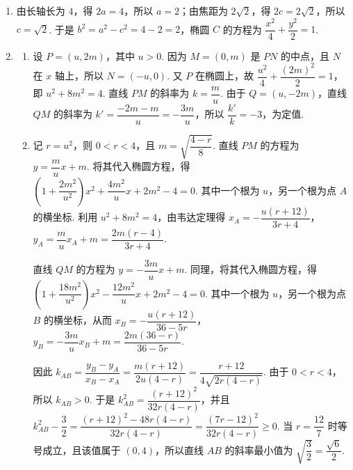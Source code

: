 \begin{solution}
\begin{enumerate}
\item 由长轴长为 \(4\)，得 \(2a=4\)，所以 \(a=2\)；由焦距为 \(2\sqrt2\)，得 \(2c=2\sqrt2\)，所以 \(c=\sqrt2\). 于是 \(b^2=a^2-c^2=4-2=2\)，椭圆 \(C\) 的方程为 \(\dfrac{x^2}{4}+\dfrac{y^2}{2}=1\).
\item
\begin{enumerate}
\item 设 \(P=(u,2m)\)，其中 \(u>0\). 因为 \(M=(0,m)\) 是 \(PN\) 的中点，且 \(N\) 在 \(x\) 轴上，所以 \(N=(-u,0)\). 又 \(P\) 在椭圆上，故 \(\dfrac{u^2}{4}+\dfrac{(2m)^2}{2}=1\)，即 \(u^2+8m^2=4\). 直线 \(PM\) 的斜率为 \(k=\dfrac{m}{u}\). 由于 \(Q=(u,-2m)\)，直线 \(QM\) 的斜率为 \(k'=\dfrac{-2m-m}{u}=-\dfrac{3m}{u}\)，所以 \(\dfrac{k'}{k}=-3\)，为定值.
\item 记 \(r=u^2\)，则 \(0<r<4\)，且 \(m=\sqrt{\dfrac{4-r}{8}}\). 直线 \(PM\) 的方程为 \(y=\dfrac{m}{u}x+m\). 将其代入椭圆方程，得
\(\left(1+\dfrac{2m^2}{u^2}\right)x^2+\dfrac{4m^2}{u}x+2m^2-4=0\). 其中一个根为 \(u\)，另一个根为点 \(A\) 的横坐标. 利用 \(u^2+8m^2=4\)，由韦达定理得
\(x_A=-\dfrac{u(r+12)}{3r+4}\)，\(y_A=\dfrac{m}{u}x_A+m=\dfrac{2m(r-4)}{3r+4}\).

直线 \(QM\) 的方程为 \(y=-\dfrac{3m}{u}x+m\). 同理，将其代入椭圆方程，得
\(\left(1+\dfrac{18m^2}{u^2}\right)x^2-\dfrac{12m^2}{u}x+2m^2-4=0\). 其中一个根为 \(u\)，另一个根为点 \(B\) 的横坐标，从而
\(x_B=-\dfrac{u(r+12)}{36-5r}\)，\(y_B=-\dfrac{3m}{u}x_B+m=\dfrac{2m(36-r)}{36-5r}\).

因此
\(k_{AB}=\dfrac{y_B-y_A}{x_B-x_A}=\dfrac{m(r+12)}{2u(4-r)}=\dfrac{r+12}{4\sqrt{2r(4-r)}}\). 由于 \(0<r<4\)，所以 \(k_{AB}>0\). 于是
\(k_{AB}^2=\dfrac{(r+12)^2}{32r(4-r)}\)，并且
\(k_{AB}^2-\dfrac32=\dfrac{(r+12)^2-48r(4-r)}{32r(4-r)}=\dfrac{(7r-12)^2}{32r(4-r)}\geq0\). 当 \(r=\dfrac{12}{7}\) 时等号成立，且该值属于 \((0,4)\)，所以直线 \(AB\) 的斜率最小值为 \(\sqrt{\dfrac32}=\dfrac{\sqrt6}{2}\).
\end{enumerate}
\end{enumerate}
\end{solution}
